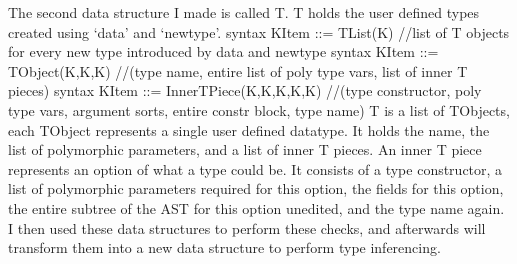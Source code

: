The second data structure I made is called T. T holds the user defined types created using ‘data’ and ‘newtype’.
syntax KItem ::= TList(K) 
//list of T objects for every new type introduced by data and newtype
syntax KItem ::= TObject(K,K,K)
//(type name, entire list of poly type vars, list of inner T pieces)
syntax KItem ::= InnerTPiece(K,K,K,K,K)
//(type constructor, poly type vars, argument sorts, entire constr block, type name)
T is a list of TObjects, each TObject represents a single user defined datatype. It holds the name, the list of polymorphic parameters, and a list of inner T pieces.
An inner T piece represents an option of what a type could be. It consists of a type constructor, a list of polymorphic parameters required for this option, the fields for this option, the entire subtree of the AST for this option unedited, and the type name again.
I then used these data structures to perform these checks, and afterwards will transform them into a new data structure to perform type inferencing.